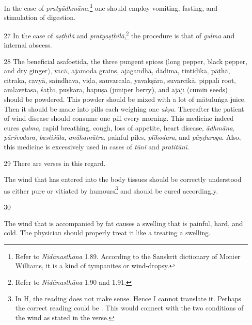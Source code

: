 \begin{translation}
    In the case of \textit{pratyādhmāna},\footnote{Refer to \textit{Nidānasthāna} 1.89. According to the Sanskrit dictionary of Monier Williams, it is a kind of tympanites or wind-dropsy.} one should employ vomiting, fasting, and stimulation of digestion.

    \item[27]
    In the case of \textit{aṣṭhīlā} and \textit{pratyaṣṭhīlā},\footnote{Refer to \textit{Nidānasthāna} 1.90 and 1.91.} the procedure is that of \textit{gulma} and internal abscess.

    \item[28]
    The beneficial asafoetida, the three pungent spices (long pepper, black pepper, and dry ginger), \gls{vacā}, \gls{ajamoda} grains, \gls{ajagandhā}, \gls{dāḍima}, \gls{tintiḍīka}, \gls{pāṭhā}, \gls{citraka}, \gls{cavyā}, \gls{saindhava}, \gls{viḍa}, \gls{sauvarcala}, \gls{yavakṣāra}, \gls{suvarcikā}, \gls{pippalī} root, \gls{amlavetasa}, \gls{śaṭhī}, \gls{puṣkara}, \gls{hapuṣa} (juniper berry), and \gls{ajājī} (cumin seeds) should be powdered. This powder should be mixed with a lot of \gls{mātuluṅga} juice. Then it should be made into pills each weighing one \textit{akṣa}. Thereafter the patient of wind disease should consume one pill every morning. This medicine indeed cures \textit{gulma}, rapid breathing, cough, loss of appetite, heart disease, \textit{ādhmāna}, \textit{pārśvodara}, \textit{bastiśūla}, \textit{anāhamūtra}, painful piles, \textit{plīhodara}, and \textit{pāṇḍuroga}. Also, this medicine is excessively used in cases of \textit{tūnī} and \textit{pratitūnī}.
 
    \item[29]
    There are verses in this regard. 
    \begin{sloka}
    The wind that has entered into the body tissues should be correctly understood as either pure or vitiated by humours\footnote{In H, the reading  does not make sense. Hence I cannot translate it. Perhaps the correct reading could be . This would connect with the two conditions of the wind as stated in the verse.} and should be cured accordingly. 
    \end{sloka}

    \item[30]
    \begin{sloka}
    The wind that is accompanied by fat causes a swelling that is painful, hard, and cold. The physician should properly treat it like a treating a swelling.
    \end{sloka}


\end{translation}
